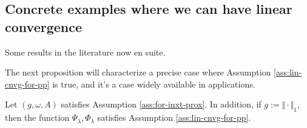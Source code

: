 \documentclass[12pt]{article}
\begin{document}
    \subsection{Concrete examples where we can have linear convergence}
        Some results in the literature now en suite.  
        \begin{definition}
            
        \end{definition}
        \begin{definition}
            
        \end{definition}
        \begin{fact}
            
        \end{fact}
        \begin{fact}
            
        \end{fact}
        \begin{fact}
            
        \end{fact}
        The next proposition will characterize a precise case where Assumption \ref{ass:lin-cnvg-for-pp} is true, and it's a case widely available in applications. 
        \begin{proposition}\label{prop:1nrm-prox-problem}
            Let $(g, \omega, A)$ satisfies Assumption \ref{ass:for-inxt-prox}. 
            In addition, if $g := \Vert \cdot\Vert_1$, then the function $\Psi_\lambda, \Phi_\lambda$ satisfies Assumption \ref{ass:lin-cnvg-for-pp}. 
        \end{proposition}
\end{document}
